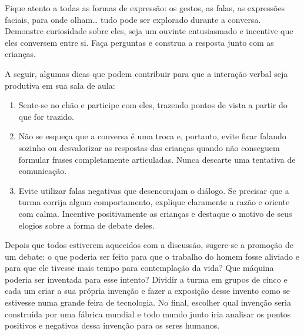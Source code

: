 \documentclass[11pt]{extarticle}
\begin{document}
Fique atento a todas as formas de expressão: os gestos, as falas, as 
expressões faciais, para onde olham\ldots{} tudo pode ser explorado durante a conversa. 
Demonstre curiosidade sobre eles, seja um ouvinte entusiasmado e incentive que eles 
conversem entre si. Faça perguntas e construa a resposta junto com as crianças. 

A seguir, algumas dicas que podem contribuir para que a interação verbal seja produtiva em sua sala de aula: 

\begin{enumerate}
\item Sente-se no chão e participe com eles, trazendo pontos de vista a partir do que for trazido.

\item Não se esqueça que a conversa é uma troca e, portanto, evite ficar falando sozinho ou desvalorizar as respostas das 
crianças quando não conseguem formular frases completamente articuladas. Nunca descarte uma tentativa de comunicação. 

\item Evite utilizar falas negativas que desencorajam o diálogo. Se precisar que a turma corrija algum comportamento, explique claramente a razão e oriente com calma. Incentive positivamente as crianças e destaque o motivo de seus elogios sobre a forma de debate deles. 

\end{enumerate}

Depois que todos estiverem aquecidos com a discussão, sugere-se a promoção de um debate: o que poderia ser feito para que o trabalho do homem fosse aliviado e para que ele tivesse mais tempo para contemplação da vida? Que máquina poderia ser inventada para esse intento? Dividir a turma em grupos de cinco e cada um criar a sua própria invenção e fazer a exposição desse invento como se estivesse numa grande feira de tecnologia. No final, escolher qual invenção seria construída por uma fábrica mundial e todo mundo junto iria analisar os pontos positivos e negativos dessa invenção para os seres humanos.

\end{document}
